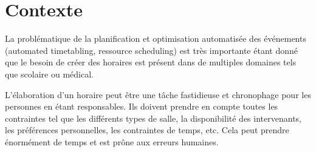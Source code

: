 \section{Contexte}
La problématique de la planification et optimisation automatisée des événements (automated timetabling, ressource scheduling) est très importante étant donné que le besoin de créer des horaires est présent dans de multiples domaines tels que scolaire ou médical.

L'élaboration d'un horaire peut être une tâche fastidieuse et chronophage pour les personnes en étant responsables. Ils doivent prendre en compte toutes les contraintes tel que les différents types de salle, la disponibilité des intervenants, les préférences personnelles, les contraintes de temps, etc. Cela peut prendre énormément de temps et est prône aux erreurs humaines.